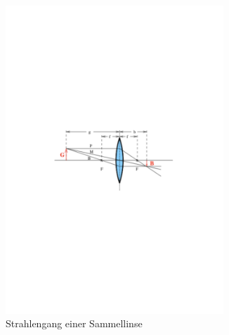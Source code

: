 \begin{figure}[h!]
 \centering
 \begin{subfigure}{0.49\textwidth}
  \centering
  \includegraphics[width=0.9\textwidth]{sammellinse.pdf}
  \caption{Strahlengang einer Sammellinse \cite{1}}
  \label{fig:sammellinse}
 \end{subfigure}
 \begin{subfigure}{0.49\textwidth}
  \centering

\end{subfigure}
\end{figure}

